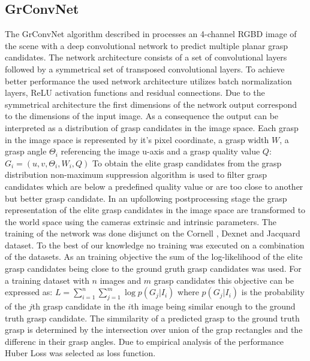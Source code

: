 \subsection{GrConvNet}
The GrConvNet algorithm described in \cite{kumra2020antipodal} processes an 4-channel RGBD image of the scene with a deep convolutional network to predict multiple
planar grasp candidates.
The network architecture consists of a set of convolutional layers followed by a symmetrical set of transposed convolutional layers.
To achieve better performance the used network architecture utilizes batch normalization layers, ReLU activation functions and residual connections.
Due to the symmetrical architecture the first dimensions of the network output correspond to the dimensions of the input image.
As a consequence the output can be interpreted as a distribution of grasp candidates in the image space.
Each grasp in the image space is represented by it's pixel coordinate, a grasp width $W$, a grasp angle $\Theta_i$ referencing the image u-axis and a grasp quality value $Q$:
$G_i = (u,v,\Theta_i, W_i, Q)$
To obtain the elite grasp candidates from the grasp distribution non-maximum suppression algorithm is used to filter grasp candidates which are below a predefined
quality value or are too close to another but better grasp candidate.
In an upfollowing postprocessing stage the grasp representation of the elite grasp candidates in the image space are transformed to the world space using the
cameras extrinsic and intrinsic parameters.
The training of the network was done disjunct on the Cornell \cite{}, Dexnet \cite{} and Jacquard \cite{} dataset. To the best of our knowledge no training was executed on a combination of the datasets.
As an training objective the sum of the log-likelihood of the elite grasp candidates being close to the ground gruth grasp candidates was used.
For a training dataset with $n$ images and $m$ grasp candidates this objective can be expressed as:
$L = \sum_{i=1}^n \sum_{j=1}^m \log p(G_j|I_i)$
where $p(G_j|I_i)$ is the probability of the $j$th grasp candidate in the $i$th image being similar enough to the ground truth grasp candidate.
The simmilarity of a predicted grasp to the ground truth grasp is determined by the intersection over union of the grap rectangles and the differenc in their grasp angles.
Due to empirical analysis of the performance Huber Loss was selected as loss function.


